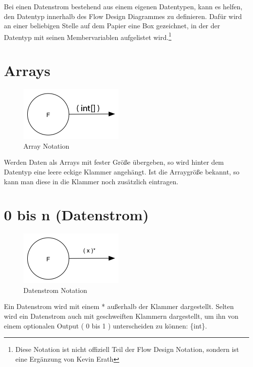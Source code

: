 Bei einen Datenstrom bestehend aus einem eigenen Datentypen, kann es helfen, den Datentyp innerhalb des Flow Design Diagrammes zu definieren.
Dafür wird an einer beliebigen Stelle auf dem Papier eine Box gezeichnet,
in der der Datentyp mit seinen Membervariablen aufgelistet wird.\footnote{Diese Notation ist nicht offiziell Teil der Flow Design Notation,
sondern ist eine Ergänzung von Kevin Erath}

\section{Arrays}

\begin{figure}[H]
	\centering
		\includegraphics[width=.5\linewidth]{./img/diagramArray.png}
	\caption{Array Notation}
\end{figure}

Werden Daten als Arrays mit fester Größe übergeben, so wird hinter dem Datentyp eine leere eckige Klammer angehängt.
Ist die Arraygröße bekannt, so kann man diese in die Klammer noch zusätzlich eintragen.



\section{0 bis n (Datenstrom)}


\begin{figure}[H]
	\centering
	\includegraphics[width=.5\linewidth]{./img/diagram0n.png}
	\caption{Datenstrom Notation}
\end{figure}



Ein Datenstrom wird mit einem * außerhalb der Klammer dargestellt.
Selten wird ein Datenstrom auch mit geschweiften Klammern dargestellt, um ihn
von einem optionalen Output ( 0 bis 1 ) unterscheiden zu können: \{int\}.

